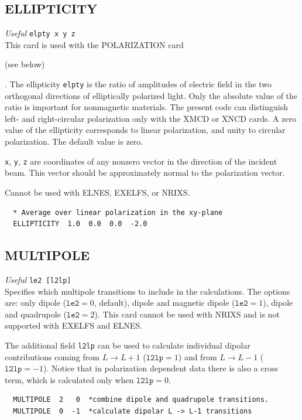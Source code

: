\documentclass[11pt,oneside]{report} %
\newenvironment{Card}[4]%
      {\vspace{3ex}%
        \subsection{#1}
        \quad\textsl{#3}\newline
        \quad\texttt{#2}\newline%
        \label{card:#4}\\}
      {}
\begin{document}
\begin{Card}{ELLIPTICITY}{elpty x y z}{Useful}{ell}
  This card is used with the POLARIZATION card 
  \begin{latexonly}
    (see below)
  \end{latexonly}.
  The ellipticity \texttt{elpty} is the ratio of amplitudes of electric
  field in the two orthogonal directions of elliptically polarized
  light. Only the absolute value of the ratio is important for
  nonmagnetic materials. The present code can distinguish left- and
  right-circular polarization only with the XMCD or XNCD cards.
  A zero value of the ellipticity corresponds to linear polarization,
  and unity to circular polarization. The default value is zero.

  \texttt{x}, \texttt{y}, \texttt{z} are coordinates of any nonzero
  vector in the direction of the incident beam. This vector should be
  approximately normal to the polarization vector.
  
  Cannot be used with ELNES, EXELFS, or NRIXS.
\begin{verbatim}
  * Average over linear polarization in the xy-plane
  ELLIPTICITY  1.0  0.0  0.0  -2.0
\end{verbatim}
\end{Card}



\begin{Card}{MULTIPOLE}{le2 [l2lp]}{Useful}{mul}
  Specifies which multipole transitions to include in the calculations.
The options are: only dipole ($\mathtt{le2}=0$, default), dipole and magnetic dipole ($\mathtt{le2}=1$), dipole and quadrupole ($\mathtt{le2}=2$).  This card cannot be used with NRIXS and is not supported with EXELFS and ELNES.

The additional field \texttt{l2lp} can be used to calculate individual dipolar contributions
coming from $L \rightarrow L+1$ ($\mathtt{l2lp}=1$) and from $L \rightarrow L-1$ 
($\mathtt{l2lp}=-1$). Notice that in polarization dependent data there is also a
cross term, which is calculated only when $\mathtt{l2lp}=0$.
\begin{verbatim}
  MULTIPOLE  2   0  *combine dipole and quadrupole transitions.
  MULTIPOLE  0  -1  *calculate dipolar L -> L-1 transitions
\end{verbatim}
\end{Card}
\end{document}
